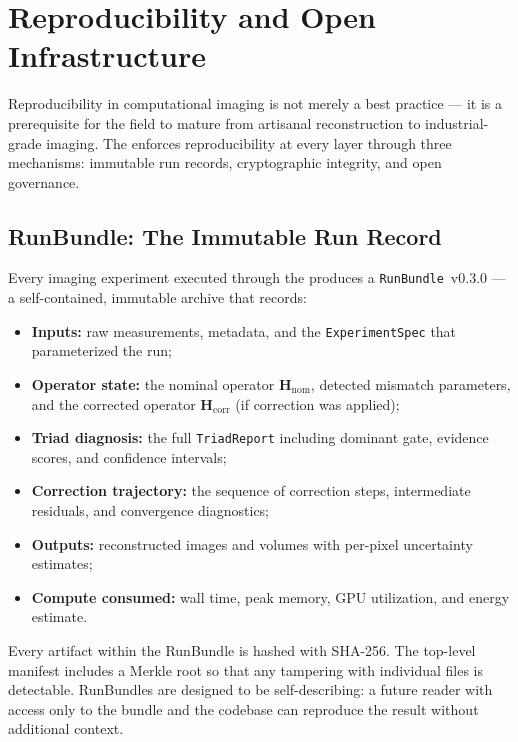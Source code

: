 
\section{Reproducibility and Open Infrastructure}
\label{sec:reproducibility}

Reproducibility in computational imaging is not merely a best practice
--- it is a prerequisite for the field to mature from artisanal
reconstruction to industrial-grade imaging.  The \pwm{} enforces
reproducibility at every layer through three mechanisms: immutable run
records, cryptographic integrity, and open governance.

\subsection{RunBundle: The Immutable Run Record}

Every imaging experiment executed through the \pwm{} produces a
\texttt{RunBundle}~v0.3.0 --- a self-contained, immutable archive that
records:
%
\begin{itemize}
    \item \textbf{Inputs:} raw measurements, metadata, and the
          \texttt{ExperimentSpec} that parameterized the run;
    \item \textbf{Operator state:} the nominal operator
          $\mathbf{H}_{\mathrm{nom}}$, detected mismatch parameters, and
          the corrected operator $\mathbf{H}_{\mathrm{corr}}$ (if
          correction was applied);
    \item \textbf{Triad diagnosis:} the full \texttt{TriadReport}
          including dominant gate, evidence scores, and confidence
          intervals;
    \item \textbf{Correction trajectory:} the sequence of correction
          steps, intermediate residuals, and convergence diagnostics;
    \item \textbf{Outputs:} reconstructed images and volumes with
          per-pixel uncertainty estimates;
    \item \textbf{Compute consumed:} wall time, peak memory, GPU
          utilization, and energy estimate.
\end{itemize}
%
Every artifact within the RunBundle is hashed with SHA-256.  The
top-level manifest includes a Merkle root so that any tampering with
individual files is detectable.  RunBundles are designed to be
self-describing: a future reader with access only to the bundle and the
\pwm{} codebase can reproduce the result without additional context.

